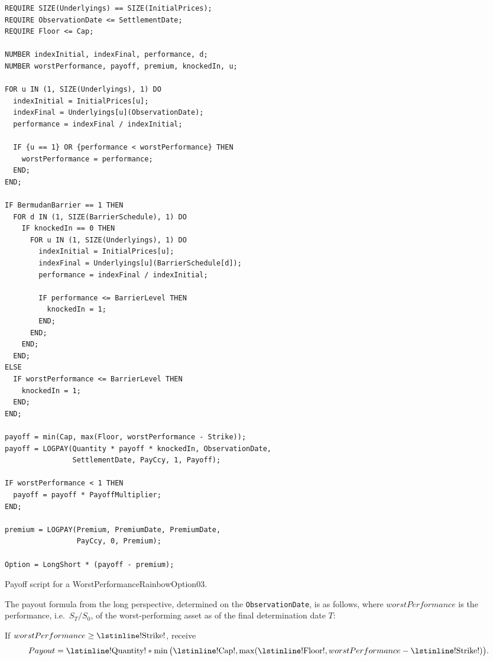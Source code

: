 \begin{listing}[hbt]
\begin{verbatim}
REQUIRE SIZE(Underlyings) == SIZE(InitialPrices);
REQUIRE ObservationDate <= SettlementDate;
REQUIRE Floor <= Cap;

NUMBER indexInitial, indexFinal, performance, d;
NUMBER worstPerformance, payoff, premium, knockedIn, u;

FOR u IN (1, SIZE(Underlyings), 1) DO
  indexInitial = InitialPrices[u];
  indexFinal = Underlyings[u](ObservationDate);
  performance = indexFinal / indexInitial;

  IF {u == 1} OR {performance < worstPerformance} THEN
    worstPerformance = performance;
  END;
END;

IF BermudanBarrier == 1 THEN
  FOR d IN (1, SIZE(BarrierSchedule), 1) DO
    IF knockedIn == 0 THEN
      FOR u IN (1, SIZE(Underlyings), 1) DO
        indexInitial = InitialPrices[u];
        indexFinal = Underlyings[u](BarrierSchedule[d]);
        performance = indexFinal / indexInitial;

        IF performance <= BarrierLevel THEN
          knockedIn = 1;
        END;
      END;
    END;
  END;
ELSE
  IF worstPerformance <= BarrierLevel THEN
    knockedIn = 1;
  END;
END;

payoff = min(Cap, max(Floor, worstPerformance - Strike));
payoff = LOGPAY(Quantity * payoff * knockedIn, ObservationDate,
                SettlementDate, PayCcy, 1, Payoff);

IF worstPerformance < 1 THEN
  payoff = payoff * PayoffMultiplier;
END;

premium = LOGPAY(Premium, PremiumDate, PremiumDate,
                 PayCcy, 0, Premium);

Option = LongShort * (payoff - premium);
\end{verbatim}
\caption{Payoff script for a WorstPerformanceRainbowOption03.}
\label{lst:worst_performance_rainbow_option_03}
\end{listing}

The payout formula from the long perspective, determined on the \lstinline!ObservationDate!,
is as follows, where $worstPerformance$ is the performance, i.e.\ $S_T/S_0$, of the
worst-performing asset as of the final determination date $T$:

If $worstPerformance \geq \text{\lstinline!Strike!}$, receive
\begin{equation*}
  Payout = \text{\lstinline!Quantity!} * \min\big(\text{\lstinline!Cap!}, \max(\text{\lstinline!Floor!}, worstPerformance - \text{\lstinline!Strike!})\big).
\end{equation*}

